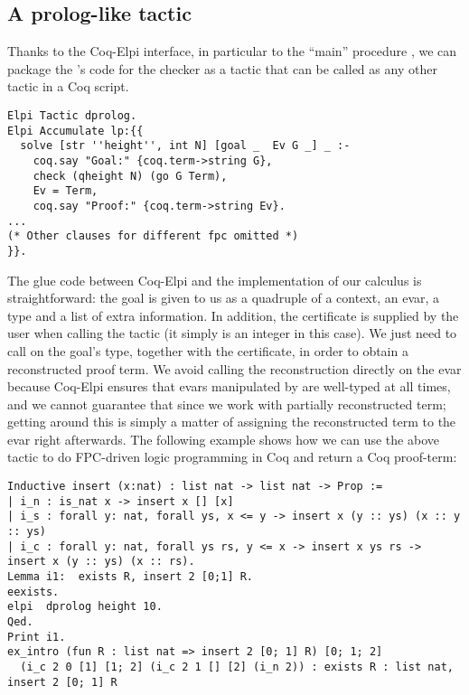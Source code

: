 

\subsection{A prolog-like tactic}

Thanks to the Coq-Elpi interface, in particular to the ``main''
procedure , we can package the \lP's code for the checker
as a tactic that can be called as any other tactic in a Coq script.

\begin{lstlisting}
Elpi Tactic dprolog.
Elpi Accumulate lp:{{
  solve [str ''height'', int N] [goal _  Ev G _] _ :-
    coq.say "Goal:" {coq.term->string G},
    check (qheight N) (go G Term),
    Ev = Term,
    coq.say "Proof:" {coq.term->string Ev}.
...
(* Other clauses for different fpc omitted *)
}}.
\end{lstlisting}

The glue code between Coq-Elpi and the implementation of our calculus is
straightforward: the goal is given to us as a quadruple of a context, an
evar, a type and a list of extra information. In addition, the certificate is
supplied by the user when calling the tactic (it simply is an integer in this
case). We just need to call  on the goal's type, together with
the certificate, in order to obtain a reconstructed proof term. We avoid
calling the reconstruction directly on the evar because Coq-Elpi ensures that
evars manipulated by \lP are well-typed at all times, and we cannot guarantee
that since we work with partially reconstructed term; getting around this is
simply a matter of assigning the reconstructed term to the evar right
afterwards.
The following example shows how we can use the above tactic to do
FPC-driven logic programming in Coq and return a Coq proof-term:
\begin{lstlisting}
Inductive insert (x:nat) : list nat -> list nat -> Prop :=
| i_n : is_nat x -> insert x [] [x]
| i_s : forall y: nat, forall ys, x <= y -> insert x (y :: ys) (x :: y :: ys)
| i_c : forall y: nat, forall ys rs, y <= x -> insert x ys rs -> insert x (y :: ys) (x :: rs).
Lemma i1:  exists R, insert 2 [0;1] R.
eexists.
elpi  dprolog height 10.
Qed.
Print i1.
ex_intro (fun R : list nat => insert 2 [0; 1] R) [0; 1; 2]
  (i_c 2 0 [1] [1; 2] (i_c 2 1 [] [2] (i_n 2)) : exists R : list nat, insert 2 [0; 1] R
\end{lstlisting}

